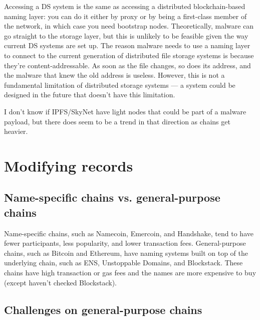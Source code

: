 \documentclass[10pt,sigconf,letterpaper]{acmart}
\begin{document}
Accessing a DS system is the same as accessing a distributed 
blockchain-based naming layer: you can do it either by proxy 
or by being a first-class member of the network, in which 
case you need bootstrap nodes. Theoretically, malware can go 
straight to the storage layer, but this is unlikely to be 
feasible given the way current DS systems are set up. The 
reason malware needs 
to use a naming layer to connect to the current generation of 
distributed file storage systems is because they're 
content-addressable. As soon as the file changes, so 
does its address, and the malware that knew the old address 
is useless. 
However, this is not a fundamental limitation of distributed 
storage systems --- a system could be designed in the future 
that doesn't have this limitation.

I don't know if IPFS/SkyNet have light nodes that could be 
part of a malware payload, but there does seem to be a trend 
in that direction as chains get heavier.

\section{Modifying records}

\subsection{Name-specific chains vs. general-purpose chains}

Name-specific chains, such as Namecoin, Emercoin, and 
Handshake, tend to have fewer participants, less popularity, 
and lower transaction fees. General-purpose chains, such as 
Bitcoin and Ethereum, have naming systems built on top of the 
underlying chain, such as ENS, Unstoppable Domains, and 
Blockstack. These chains have high transaction or gas fees 
and the names are more expensive to buy (except haven't 
checked Blockstack). 

\subsection{Challenges on general-purpose chains}
\end{document}

